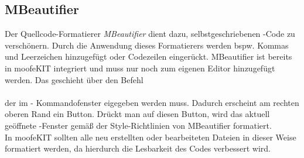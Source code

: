 \documentclass[12pt,bibstyle=none,pagenumberinfooter]{ifmdocument}
\begin{document}
%
\subsection{MBeautifier}\label{subsec:mbeautifier}
Der Quellcode-Formatierer \textit{MBeautifier} dient dazu, selbstgeschriebenen \matlab -Code zu verschönern. Durch die Anwendung dieses Formatierers werden bspw. Kommas und Leerzeichen hinzugefügt oder Codezeilen eingerückt. MBeautifier ist bereits in moofeKIT integriert und muss nur noch zum eigenen Editor hinzugefügt werden. Das geschieht über den Befehl\\
\\
der im \matlab - Kommandofenster eigegeben werden muss. Dadurch erscheint am rechten oberen Rand ein Button. Drückt man auf diesen Button, wird das aktuell geöffnete \matlab -Fenster gemäß der Style-Richtlinien von MBeautifier formatiert.\\
In moofeKIT sollten alle neu erstellten oder bearbeiteten Dateien in dieser Weise formatiert werden, da hierdurch die Lesbarkeit des Codes verbessert wird.
\end{document}
